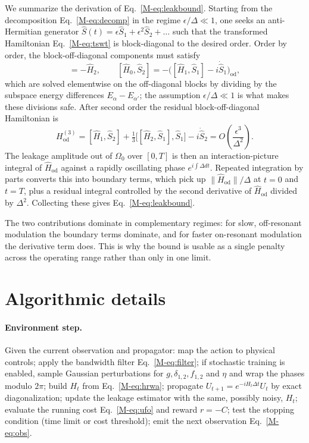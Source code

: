 \documentclass[aps,prx,twocolumn,superscriptaddress,nofootinbib,amsmath,amssymb,floatfix]{revtex4-2}
\newcommand{\Hod}{\hat{H}_{\mathrm{od}}}
\begin{document}
We summarize the derivation of Eq.~\eqref{M-eq:leakbound}. Starting from the decomposition
Eq.~\eqref{M-eq:decomp} in the regime $\epsilon/\Delta\ll1$, one seeks an anti-Hermitian generator
$\hat S(t)=\epsilon\hat S_1+\epsilon^2\hat S_2+\dots$ such that the transformed Hamiltonian
Eq.~\eqref{M-eq:tswt} is block-diagonal to the desired order. Order by order, the block-off-diagonal
components must satisfy
\begin{equation}
[\hat H_0,\hat S_1]=-\hat H_2,\qquad
[\hat H_0,\hat S_2]=-\bigl([\hat H_1,\hat S_1]-i\dot{\hat S}_1\bigr)_{\mathrm{od}},
\label{eq:generators}
\end{equation}
which are solved elementwise on the off-diagonal blocks by dividing by the subspace energy differences
$E_\alpha-E_{\alpha'}$; the assumption $\epsilon/\Delta\ll1$ is what makes these divisions safe. After
second order the residual block-off-diagonal Hamiltonian is
\begin{equation}
H_{\mathrm{od}}^{(3)}=[\hat H_1,\hat S_2]+\tfrac{1}{3}\bigl[[\hat H_2,\hat S_1],\hat S_1\bigr]-i\dot{\hat S}_2
=O\!\left(\frac{\epsilon^3}{\Delta^2}\right).
\label{eq:hod3}
\end{equation}
The leakage amplitude out of $\Omega_0$ over $[0,T]$ is then an interaction-picture integral of
$\Hod$ against a rapidly oscillating phase $e^{i\int\Delta dt}$. Repeated integration by parts
converts this into boundary terms, which pick up $\|\Hod\|/\Delta$ at $t=0$ and $t=T$, plus a residual
integral controlled by the second derivative of $\Hod$ divided by $\Delta^2$. Collecting these gives
Eq.~\eqref{M-eq:leakbound}.

The two contributions dominate in complementary regimes: for slow, off-resonant modulation the
boundary terms dominate, and for faster on-resonant modulation the derivative term does. This is why
the bound is usable as a single penalty across the operating range rather than only in one limit.

\section{Algorithmic details}
\label{app:algo}

\paragraph*{Environment step.}
Given the current observation and propagator: map the action to physical controls; apply the bandwidth
filter Eq.~\eqref{M-eq:filter}; if stochastic training is enabled, sample Gaussian perturbations for
$g,\delta_{1,2},f_{1,2}$ and $\eta$ and wrap the phases modulo $2\pi$; build $H_t$ from
Eq.~\eqref{M-eq:hrwa}; propagate $U_{t+1}=e^{-iH_t\Delta t}U_t$ by exact diagonalization; update the
leakage estimator with the same, possibly noisy, $H_t$; evaluate the running cost Eq.~\eqref{M-eq:ufo} and
reward $r=-C$; test the stopping
condition (time limit or cost threshold); emit the next observation Eq.~\eqref{M-eq:obs}.
\end{document}
